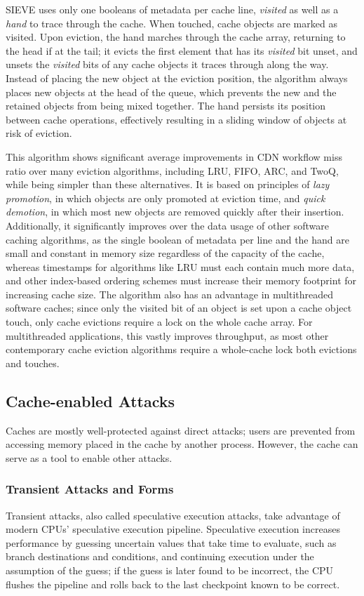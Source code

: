 SIEVE uses only one booleans of metadata per cache line, \textit{visited}
as well as a \textit{hand} to trace through the cache.
When touched, cache objects are marked as visited.
Upon eviction, the hand marches through the cache array, returning to the head if at the tail;
it evicts the first element that has its \textit{visited} bit unset,
and unsets the \textit{visited} bits of any cache objects it traces through along the way.
Instead of placing the new object at the eviction position,
the algorithm always places new objects at the head of the queue,
which prevents the new and the retained objects from being mixed together.
The hand persists its position between cache operations,
effectively resulting in a sliding window of objects at risk of eviction.

This algorithm shows significant average improvements in CDN workflow miss ratio
over many eviction algorithms,
including LRU, FIFO, ARC, and TwoQ, while being simpler than these alternatives.
It is based on principles of \textit{lazy promotion},
in which objects are only promoted at eviction time,
and \textit{quick demotion}, in which most new objects are removed quickly after their insertion.
Additionally, it significantly improves over the data usage of other
software caching algorithms, as the single boolean of metadata per line and the hand
are small and constant in memory size regardless of the capacity of the cache,
whereas timestamps for algorithms like LRU must each contain much more data,
and other index-based ordering schemes must increase their memory footprint for increasing cache size.
The algorithm also has an advantage in multithreaded software caches;
since only the visited bit of an object is set upon a cache object touch,
only cache evictions require a lock on the whole cache array.
For multithreaded applications, this vastly improves throughput,
as most other contemporary cache eviction algorithms require a whole-cache lock
both evictions and touches.

\subsection{Cache-enabled Attacks}
Caches are mostly well-protected against direct attacks;
users are prevented from accessing memory placed in the cache by another process.
However, the cache can serve as a tool to enable other attacks.

\subsubsection{Transient Attacks and Forms}
Transient attacks, also called speculative execution attacks, take advantage of modern CPUs' speculative execution pipeline.
Speculative execution increases performance by guessing uncertain values that take time to evaluate, such as branch destinations
and conditions, and continuing execution under the assumption of the guess;
if the guess is later found to be incorrect, the CPU flushes the pipeline and rolls back to the last checkpoint known to be correct.


